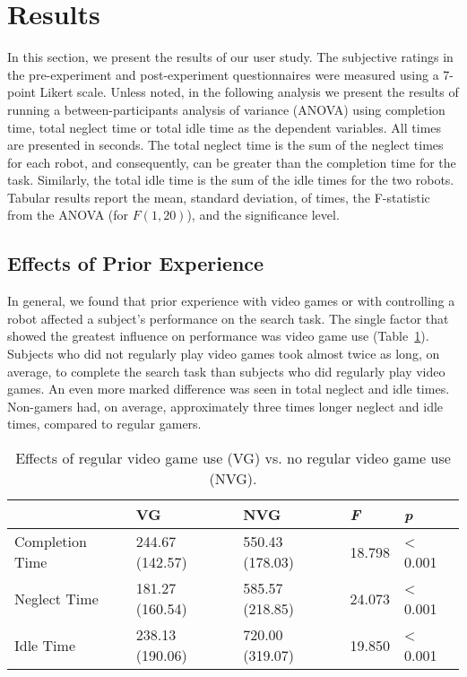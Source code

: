 \section{Results}
\label{sec:study-results}
In this section, we present the results of our user study. The subjective ratings in the pre-experiment and post-experiment questionnaires were measured using a 7-point Likert scale. Unless noted, in the following analysis we present the results of running a between-participants analysis of variance (ANOVA) using completion time, total neglect time or total idle time as the dependent variables. All times are presented in seconds. The total neglect time is the sum of the neglect times for each robot, and consequently, can be greater than the completion time for the task. Similarly, the total idle time is the sum of the idle times for the two robots. Tabular results report the mean, standard deviation, of times, the F-statistic from the ANOVA (for $F(1,20)$), and the significance level. 

\subsection{Effects of Prior Experience} %
\label{sub:effects_of_prior_experience}
In general, we found that prior experience with video games or with controlling a robot affected a subject’s performance on the search task.
The single factor that showed the greatest influence on performance was video game use (Table~\ref{tab:prior-vg}). Subjects who did not regularly play video games took almost twice as long, on average, to complete the search task than subjects who did regularly play video games. An even more marked difference was seen in total neglect and idle times. Non-gamers had, on average, approximately three times longer neglect and idle times, compared to regular gamers.


\begin{table}[ht]
\label{tab:prior-vg}
\begin{center}
	\begin{tabular}{| l | l | l | l | l |}
	\hline
		& \textbf{VG} & \textbf{NVG} & \emph{F} & \emph{p}\\ \hline
		Completion Time & 244.67 (142.57) & 550.43 (178.03) & 18.798 & < 0.001\\ \hline
		Neglect Time & 181.27 (160.54) & 585.57 (218.85) & 24.073 & < 0.001\\ \hline
		Idle Time & 238.13 (190.06) & 720.00 (319.07) & 19.850 & < 0.001\\ \hline
	\hline
	\end{tabular}
	\caption{Effects of regular video game use (VG) vs. no regular video game use (NVG).}
\end{center}
\end{table}


